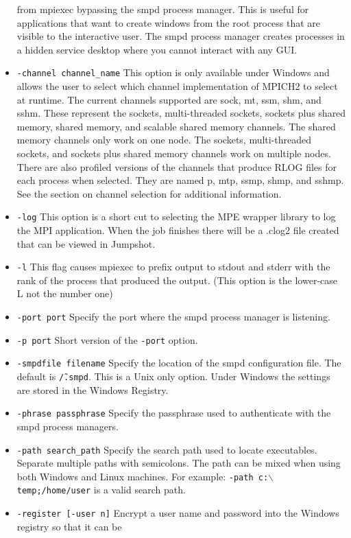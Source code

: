 \documentclass[dvipdfm,11pt]{article}
\begin{document}
\begin{itemize}
from mpiexec bypassing the smpd process manager.  This is useful for applications
that want to create windows from the root process that are visible to the interactive
user.  The smpd process manager creates processes in a hidden service desktop
where you cannot interact with any GUI.
\item \texttt{-channel channel\_name}
This option is only available under Windows and allows the user to select which
channel implementation of MPICH2 to select at runtime.  The current channels
supported are sock, mt, ssm, shm, and sshm.  These represent the sockets, 
multi-threaded sockets, sockets plus shared memory, shared memory, and scalable
shared memory channels.  The shared memory channels only work on one node.  
The sockets, multi-threaded sockets, and sockets plus shared memory channels 
work on multiple nodes.  There are also profiled versions of the channels that
produce RLOG files for each process when selected.  They are named p, mtp, ssmp,
shmp, and sshmp.  See the section on channel selection for additional information.
\item \texttt{-log}
This option is a short cut to selecting the MPE wrapper library to log the MPI
application.  When the job finishes there will be a .clog2 file created that
can be viewed in Jumpshot.
\item \texttt{-l}
This flag causes mpiexec to prefix output to stdout and stderr with the rank of
the process that produced the output.  (This option is the lower-case L not the
number one)
\item \texttt{-port port}
Specify the port where the smpd process manager is listening.
\item \texttt{-p port}
Short version of the \texttt{-port} option.
\item \texttt{-smpdfile filename}
Specify the location of the smpd configuration file.  The default is \texttt{\~/.smpd}.
This is a Unix only option.  Under Windows the settings are stored in the Windows Registry.
\item \texttt{-phrase passphrase}
Specify the passphrase used to authenticate with the smpd process managers.
\item \texttt{-path search\_path}
Specify the search path used to locate executables.  Separate multiple paths with semicolons.
The path can be mixed when using both Windows and Linux machines.  For example:
\texttt{-path c:$\backslash$temp;/home/user} is a valid search path.
\item \texttt{-register [-user n]}
Encrypt a user name and password into the Windows registry so that it can be 

\end{itemize}
\end{document}
